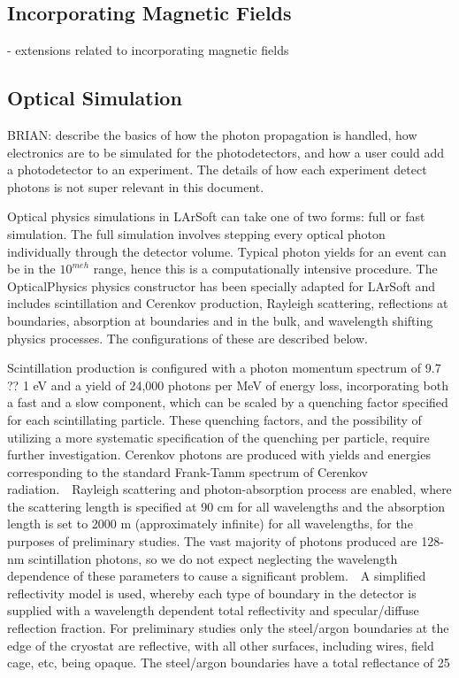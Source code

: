 \documentclass[12pt]{elsarticle}
\begin{document}
\subsection{Incorporating Magnetic Fields}
- extensions related to incorporating magnetic fields
\subsection{Optical Simulation}
BRIAN: describe the basics of how the photon propagation is handled, how electronics are to be simulated for the photodetectors, and how a user could add a photodetector to an experiment.  The details of how each experiment detect photons is not super relevant in this document.

Optical physics simulations in LArSoft can take one of two forms: full or fast 
simulation.  The full simulation involves stepping every optical photon individually through the detector volume.  Typical photon yields for an event can be in the $10^{meh}$ range, hence this is a computationally intensive procedure.  The OpticalPhysics physics constructor has been specially adapted for LArSoft and includes scintillation and Cerenkov production, Rayleigh scattering, reflections at boundaries, absorption at boundaries and in the bulk, and wavelength shifting physics processes.  The configurations of these are described below.

Scintillation production is configured with a photon momentum spectrum of 9.7 ?? 1 eV and a yield of 24,000 photons per MeV of energy loss, incorporating both a fast and a slow component, which can be scaled by a quenching factor specified for each scintillating particle.  These quenching factors, and the possibility of utilizing a more systematic specification of the quenching per particle, require further investigation. Cerenkov photons are produced with yields and energies corresponding to the standard Frank-Tamm spectrum of Cerenkov radiation.\
\
Rayleigh scattering and photon-absorption process are enabled, where the scattering length is specified at 90 cm for all wavelengths and the absorption length is set to 2000 m (approximately infinite) for all wavelengths, for the purposes of preliminary studies.  The vast majority of photons produced are 128-nm scintillation photons, so we do not expect neglecting the wavelength dependence of these parameters to cause a significant problem.\
\
A simplified reflectivity model is used, whereby each type of boundary in the detector is supplied with a wavelength dependent total reflectivity and specular/diffuse reflection fraction.   For  preliminary  studies  only the  steel/argon boundaries  at  the  edge of the cryostat are  reflective,  with  all  other  surfaces,  including  wires,  field cage,  etc,  being opaque.   The steel/argon boundaries have a total reflectance of 25 %
\end{document}
